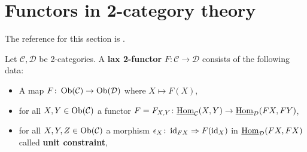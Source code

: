 \section{Functors in 2-category theory}

The reference for this section is \cite[2.2.4-2.2.8]{kerodon}.

\begin{defi}
\label{lax_functor_defi}
	Let $ \mathcal{ C } , \mathcal{ D } $ be 2-categories.
	A \textbf{lax 2-functor} $ F \colon \mathcal{ C } \to \mathcal{ D } $ consists of the following data:
	\begin{itemize}
		\item 
		A map $ F \colon \operatorname{Ob} ( \mathcal{ C } ) \to \operatorname{Ob} ( \mathcal{ D } ) $ where $ X \mapsto F ( X ) $,
		
		\item 
		for all $  X , Y \in \operatorname{Ob} ( \mathcal{ C } ) $ a functor $ F = F_{ X , Y } \colon \underline{ \operatorname{Hom} }_{ \mathcal{ C } } ( X , Y ) \to \underline{ \operatorname{Hom} }_{ \mathcal{ D } } ( F X , F Y ) $,
		
		\item 
		for all $ X , Y , Z \in \operatorname{Ob}( \mathcal{ C } ) $ a morphism $ \epsilon_X \colon \operatorname{id}_{ F X } \Rightarrow F ( \operatorname{id}_X ) $ in $ \underline{ \operatorname{Hom} }_{ \mathcal{ D } } ( F X , F X ) $ called \textbf{unit constraint},
		

\end{itemize}
\end{defi}

